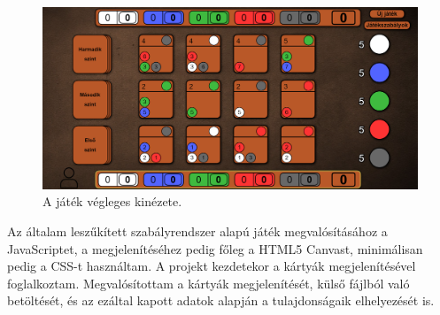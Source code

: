 \begin{figure}[h]
\centering
\includegraphics[scale=0.3]{images/screen_structure.png}
\caption{A játék végleges kinézete.}
\label{fig:screen_structure}
\end{figure}



Az általam leszűkített szabályrendszer alapú játék megvalósításához a JavaScriptet, a megjelenítéséhez pedig főleg a HTML5 Canvast, minimálisan pedig a CSS-t használtam. A projekt kezdetekor a kártyák megjelenítésével foglalkoztam. Megvalósítottam a kártyák megjelenítését, külső fájlból való betöltését, és az ezáltal kapott adatok alapján a tulajdonságaik elhelyezését is.













